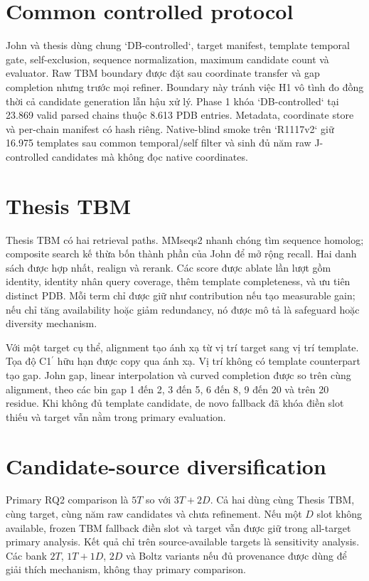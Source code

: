 \documentclass[12pt,a4paper,oneside]{report}
\newcommand{\cprime}{C1$^{\prime}$}
\begin{document}
\section{Common controlled protocol}

John và thesis dùng chung `DB-controlled`, target manifest, template temporal gate,
self-exclusion, sequence normalization, maximum candidate count và evaluator. Raw TBM
boundary được đặt sau coordinate transfer và gap completion nhưng trước mọi refiner.
Boundary này tránh việc H1 vô tình đo đồng thời cả candidate generation lẫn hậu xử lý.
Phase 1 khóa `DB-controlled` tại 23.869 valid parsed chains thuộc 8.613 PDB entries.
Metadata, coordinate store và per-chain manifest có hash riêng. Native-blind smoke trên
`R1117v2` giữ 16.975 templates sau common temporal/self filter và sinh đủ năm raw
J-controlled candidates mà không đọc native coordinates.

\section{Thesis TBM}

Thesis TBM có hai retrieval paths. MMseqs2 nhanh chóng tìm sequence homolog; composite
search kế thừa bốn thành phần của John để mở rộng recall. Hai danh sách được hợp nhất,
realign và rerank. Các score được ablate lần lượt gồm identity, identity nhân query
coverage, thêm template completeness, và ưu tiên distinct PDB. Mỗi term chỉ được giữ
như contribution nếu tạo measurable gain; nếu chỉ tăng availability hoặc giảm
redundancy, nó được mô tả là safeguard hoặc diversity mechanism.

Với một target cụ thể, alignment tạo ánh xạ từ vị trí target sang vị trí template. Tọa
độ \cprime{} hữu hạn được copy qua ánh xạ. Vị trí không có template counterpart tạo
gap. John gap, linear interpolation và curved completion được so trên cùng alignment,
theo các bin gap 1 đến 2, 3 đến 5, 6 đến 8, 9 đến 20 và trên 20 residue. Khi không đủ
template candidate, de novo fallback đã khóa điền slot thiếu và target vẫn nằm trong
primary evaluation.

\section{Candidate-source diversification}

Primary RQ2 comparison là $5T$ so với $3T+2D$. Cả hai dùng cùng Thesis TBM, cùng target,
cùng năm raw candidates và chưa refinement. Nếu một $D$ slot không available, frozen
TBM fallback điền slot và target vẫn được giữ trong all-target primary analysis. Kết
quả chỉ trên source-available targets là sensitivity analysis. Các bank $2T$,
$1T+1D$, $2D$ và Boltz variants nếu đủ provenance được dùng để giải thích mechanism,
không thay primary comparison.
\end{document}
